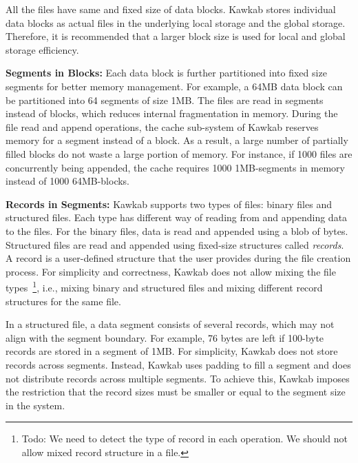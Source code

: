 \documentclass[]{article}
\newcommand{\subtopic}[1]{\vspace{1.5pt} \noindent \textbf{#1}}
\begin{document}
All the files have same and fixed size of data blocks. Kawkab stores
individual data blocks as actual files in the underlying local storage and 
the global storage. Therefore, it is recommended that a larger block
size is used for local and global storage efficiency. 

\subtopic{Segments in Blocks:} Each data block is further partitioned into
fixed size segments for better memory management. For example, a 64MB data
block can be partitioned into 64 segments of size 1MB.  
The files are read in segments instead of blocks, which reduces internal
fragmentation in memory.  During the file read and append operations, the cache
sub-system of Kawkab reserves memory for a segment instead of a block. As a
result, a large number of partially filled blocks do not waste a large portion
of memory.  For instance, if 1000 files are concurrently being appended, the
cache requires 1000 1MB-segments in memory instead of 1000 64MB-blocks.



\subtopic{Records in Segments:} 
Kawkab supports two types of files: binary files and structured files.
Each type has different way of reading from and appending data to the files.
For the binary files, data is read and appended using a blob of bytes.
Structured files are read and appended using fixed-size structures
called \textit{records}. A record is a user-defined structure that
the user provides during the file creation process.
For simplicity and correctness, Kawkab does not allow mixing the file
types~\footnote{Todo: We need to detect the type of record in each operation. We
should not allow mixed record structure in a file.}, i.e., mixing binary and
structured files and mixing different record structures for the same file.


In a structured file, a data segment consists of several records, which may not
align with the segment boundary. For example, 76 bytes are left if 100-byte
records are stored in a segment of 1MB. For simplicity, Kawkab does not store
records across segments.  Instead, Kawkab uses padding to fill a segment and
does not distribute records across multiple segments. To achieve this, Kawkab
imposes the restriction that the record sizes must be smaller or equal to the
segment size in the system. 
\end{document}

